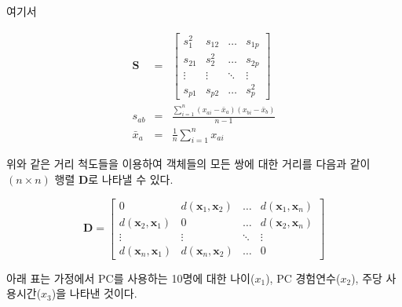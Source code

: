\documentclass[]{book}
\begin{document}
여기서

\begin{eqnarray*}
\mathbf{S} &=& \begin{bmatrix}
s_1^2 & s_{12} & \dots & s_{1p}\\
s_{21} & s_2^2 & \dots & s_{2p}\\
\vdots & \vdots & \ddots & \vdots\\
s_{p1} & s_{p2} & \dots & s_p^2
\end{bmatrix}\\
s_{ab} &=& \frac{\sum_{i = 1}^{n} (x_{ai} - \bar{x}_a)(x_{bi} - \bar{x}_b)}{n - 1}\\
\bar{x}_a &=& \frac{1}{n} \sum_{i = 1}^{n} x_{ai}
\end{eqnarray*}

위와 같은 거리 척도들을 이용하여 객체들의 모든 쌍에 대한 거리를 다음과 같이 \((n \times n)\) 행렬 \(\mathbf{D}\)로 나타낼 수 있다.

\begin{equation*}
\mathbf{D} = \begin{bmatrix}
0 & d(\mathbf{x}_1, \mathbf{x}_2) & \dots & d(\mathbf{x}_1, \mathbf{x}_n)\\
d(\mathbf{x}_2, \mathbf{x}_1) & 0 & \dots & d(\mathbf{x}_2, \mathbf{x}_n)\\
\vdots & \vdots & \ddots & \vdots \\
d(\mathbf{x}_n, \mathbf{x}_1) & d(\mathbf{x}_n, \mathbf{x}_2) & \dots & 0
\end{bmatrix}
\end{equation*}

아래 표는 가정에서 PC를 사용하는 10명에 대한 나이(\(x_1\)), PC 경험연수(\(x_2\)), 주당 사용시간(\(x_3\))을 나타낸 것이다.
\end{document}
